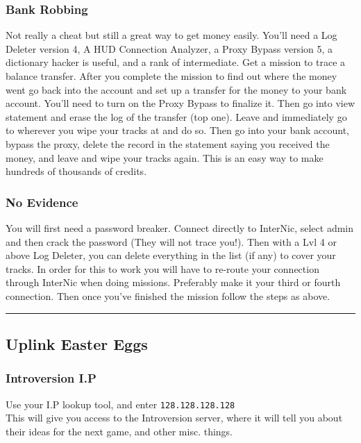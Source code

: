 \documentclass[11pt,twoside,a4paper]{book}
\begin{document}
\subsubsection{Bank Robbing}

Not really a cheat but still a great way to get money easily. You'll need a Log Deleter version 4, A HUD Connection Analyzer, a Proxy Bypass version 5, a dictionary hacker is useful, and a rank of intermediate. Get a mission to trace a balance transfer. After you complete the mission to find out where the money went go back into the account and set up a transfer for the money to your bank account. You'll need to turn on the Proxy Bypass to finalize it. Then go into view statement and erase the log of the transfer (top one). Leave and immediately go to wherever you wipe your tracks at and do so. Then go into your bank account, bypass the proxy, delete the record in the statement saying you received the money, and leave and wipe your tracks again. This is an easy way to make hundreds of thousands of credits.

\subsubsection{No Evidence}

You will first need a password breaker. Connect directly to InterNic, select admin and then crack the password (They will not trace you!). Then with a Lvl 4 or above Log Deleter, you can delete everything in the list (if any) to cover your tracks. In order for this to work you will have to re-route your connection through InterNic when doing missions. Preferably make it your third or fourth connection. Then once you've finished the mission follow the steps as above.

\begin{center} \rule{0.85\textwidth}{0.01cm} \end{center}

\subsection{Uplink Easter Eggs}

\subsubsection{Introversion I.P}

Use your I.P lookup tool, and enter \texttt{128.128.128.128} ~\\
This will give you access to the Introversion server, where it will tell you about their ideas for the next game, and other misc. things. ~\\
\end{document}

